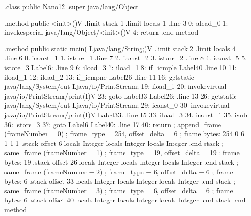 \documentclass[12pt,a4paper,twoside]{report}
\begin{document}
\begin{terminal}
.class public Nano12
.super java/lang/Object

.method public <init>()V
  .limit stack 1
  .limit locals 1
  .line 3
  0: aload_0
  1: invokespecial java/lang/Object/<init>()V
  4: return
.end method

.method public static main([Ljava/lang/String;)V
  .limit stack 2
  .limit locals 4
  .line 6
  0: iconst_1
  1: istore_1
  .line 7
  2: iconst_2
  3: istore_2
  .line 8
  4: iconst_5
  5: istore_3
Label6:
  .line 9
  6: iload_3
  7: iload_1
  8: if_icmple Label40
  .line 10
  11: iload_1
  12: iload_2
  13: if_icmpne Label26
  .line 11
  16: getstatic java/lang/System/out Ljava/io/PrintStream;
  19: iload_1
  20: invokevirtual java/io/PrintStream/print(I)V
  23: goto Label33
Label26:
  .line 13
  26: getstatic java/lang/System/out Ljava/io/PrintStream;
  29: iconst_0
  30: invokevirtual java/io/PrintStream/print(I)V
Label33:
  .line 15
  33: iload_3
  34: iconst_1
  35: isub
  36: istore_3
  37: goto Label6
Label40:
  .line 17
  40: return
  ; append_frame (frameNumber = 0)
  ; frame_type = 254, offset_delta = 6
  ; frame bytes: 254 0 6 1 1 1
  .stack
    offset 6
    locals Integer
    locals Integer
    locals Integer
    .end stack
  ; same_frame (frameNumber = 1)
  ; frame_type = 19, offset_delta = 19
  ; frame bytes: 19
  .stack
    offset 26
    locals Integer
    locals Integer
    locals Integer
    .end stack
  ; same_frame (frameNumber = 2)
  ; frame_type = 6, offset_delta = 6
  ; frame bytes: 6
  .stack
    offset 33
    locals Integer
    locals Integer
    locals Integer
    .end stack
  ; same_frame (frameNumber = 3)
  ; frame_type = 6, offset_delta = 6
  ; frame bytes: 6
  .stack
    offset 40
    locals Integer
    locals Integer
    locals Integer
    .end stack
.end method

\end{terminal}
\end{document}
